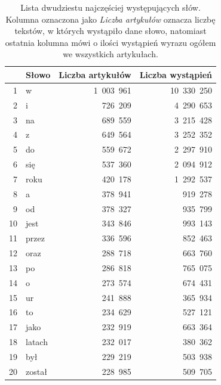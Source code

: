 \documentclass{praca1}
\begin{document}
\begin{table}[ht]
\centering
\begin{tabular}{|r|l|r|r|}
  \hline
 & Słowo & Liczba artykułów & Liczba wystąpień \\ 
  \hline
1 & w & 1\ 003\ 961 & 10\ 330\ 250 \\ 
  2 & i & 726\ 209 & 4\ 290\ 653 \\ 
  3 & na & 689\ 559 & 3\ 215\ 428 \\ 
  4 & z & 649\ 564 & 3\ 252\ 352 \\ 
  5 & do & 559\ 672 & 2\ 297\ 910 \\ 
  6 & się & 537\ 360 & 2\ 094\ 912 \\ 
  7 & roku & 420\ 178 & 1\ 292\ 537 \\ 
  8 & a & 378\ 941 & 919\ 278 \\ 
  9 & od & 378\ 327 & 935\ 799 \\ 
  10 & jest & 343\ 846 & 993\ 143 \\ 
  11 & przez & 336\ 596 & 852\ 463 \\ 
  12 & oraz & 288\ 718 & 663\ 760 \\ 
  13 & po & 286\ 818 & 765\ 075 \\ 
  14 & o & 273\ 574 & 674\ 431 \\ 
  15 & ur & 241\ 888 & 365\ 934 \\ 
  16 & to & 234\ 629 & 527\ 121 \\ 
  17 & jako & 232\ 919 & 663\ 364 \\ 
  18 & latach & 232\ 017 & 380\ 362 \\ 
  19 & był & 229\ 219 & 503\ 938 \\ 
  20 & został & 228\ 985 & 509\ 705 \\ 
   \hline
\end{tabular}
\caption{Lista dwudziestu najczęściej występujących słów. Kolumna oznaczona jako \emph{Liczba artykułów} oznacza liczbę tekstów, w których wystąpiło dane słowo, natomiast ostatnia kolumna mówi o ilości wystąpień wyrazu ogółem we wszystkich artykułach.} 
\label{tab:001}
\end{table}
\end{document}
